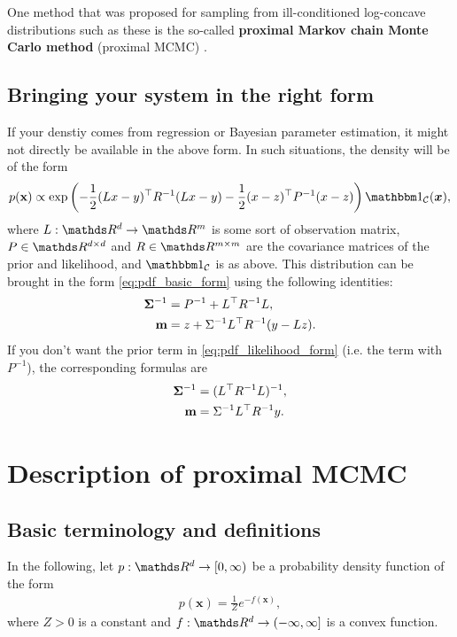 \documentclass[10pt]{article}
\numberwithin{equation}{section}
\begin{document}
One method that was proposed for sampling from ill-conditioned log-concave distributions such as these is the so-called \textbf{proximal Markov chain Monte Carlo method} (proximal MCMC) \cite{Per16, DurMouPer18}.

\subsection{Bringing your system in the right form}

If your denstiy comes from regression or Bayesian parameter estimation, it might not directly be available in the above form. In such situations, the density will be of the form
\begin{align}
p(\*x) \propto \exp \left( - \frac{1}{2} (L x - y)^\top R^{-1} (Lx - y) - \frac{1}{2} (x - z)^\top P^{-1} (x - z) \right) \indicator{\mathcal C}(\bm x), \label{eq:pdf_likelihood_form}
\end{align}
where $L: \R^d \to \R^m$ is some sort of observation matrix, $P \in \R^{d \times d}$ and $R \in \R^{m \times m}$ are the covariance matrices of the prior and likelihood, and $\indicator{\mathcal C}$ is as above. This distribution can be brought in the form \eqref{eq:pdf_basic_form} using the following identities:
\begin{align}
\mathbf{\Sigma}^{-1} &= P^{-1} + L^\top R^{-1} L, \label{eq:sigma_formula} \\
\mathbf{m} &= z + \Sigma^{-1} L^\top R^{-1} (y - L z). \label{eq:m_formula}
\end{align}
If you don't want the prior term in \eqref{eq:pdf_likelihood_form} (i.e. the term with $P^{-1}$), the corresponding formulas are
\begin{align*}
\mathbf{\Sigma}^{-1} & = (L^\top R^{-1} L)^{-1}, \\
\mathbf{m} & = \Sigma^{-1} L^\top R^{-1} y.
\end{align*}




\section{Description of proximal MCMC}

\subsection{Basic terminology and definitions}

In the following, let $p: \R^d \to [0, \infty)$ be a probability density function of the form
\begin{align*}
p(\bm x) = \frac{1}{Z} e^{-f(\bm x)},
\end{align*}
where $Z > 0$ is a constant and $f: \R^d \to (-\infty, \infty]$ is a convex function.
\end{document}
